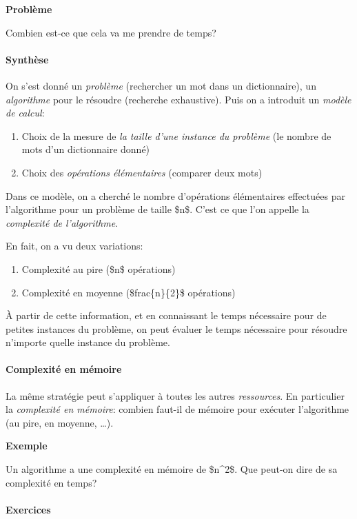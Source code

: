 \textbf{Problème}

Combien est-ce que cela va me prendre de temps?

\paragraph{Synthèse}

On s'est donné un \emph{problème} (rechercher un mot dans un
dictionnaire), un \emph{algorithme} pour le résoudre (recherche
exhaustive). Puis on a introduit un \emph{modèle de calcul}:

\begin{enumerate}
\item
  Choix de la mesure de \emph{la taille d'une instance du problème} (le
  nombre de mots d'un dictionnaire donné)
\item
  Choix des \emph{opérations élémentaires} (comparer deux mots)
\end{enumerate}

Dans ce modèle, on a cherché le nombre d'opérations élémentaires
effectuées par l'algorithme pour un problème de taille \$n\$. C'est ce
que l'on appelle la \emph{complexité de l'algorithme}.

En fait, on a vu deux variations:

\begin{enumerate}
\item
  Complexité au pire (\$n\$ opérations)
\item
  Complexité en moyenne (\$frac\{n\}\{2\}\$ opérations)
\end{enumerate}

À partir de cette information, et en connaissant le temps nécessaire
pour de petites instances du problème, on peut évaluer le temps
nécessaire pour résoudre n'importe quelle instance du problème.

\paragraph{Complexité en mémoire}

La même stratégie peut s'appliquer à toutes les autres
\emph{ressources}. En particulier la \emph{complexité en mémoire}:
combien faut-il de mémoire pour exécuter l'algorithme (au pire, en
moyenne, \ldots{}).

\textbf{Exemple}

Un algorithme a une complexité en mémoire de \$n\^{}2\$. Que peut-on
dire de sa complexité en temps?

\paragraph{Exercices}

